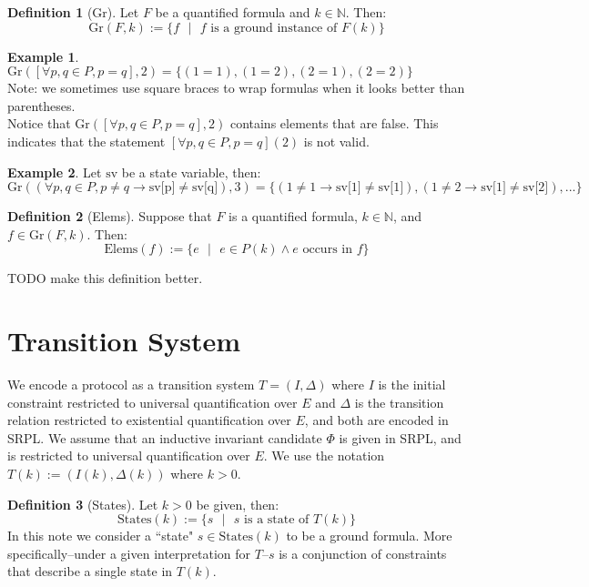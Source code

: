 \documentclass[12pt]{article}
\theoremstyle{definition}
\newtheorem{definition}{Definition}
\newtheorem{example}{Example}
\theoremstyle{remark}
\newcommand{\st}{\text{ }|\text{ }}
\newcommand{\states}{\text{States}}
\newcommand{\gr}{\text{Gr}}
\newcommand{\elems}{\text{Elems}}
\begin{document}
\begin{definition}[Gr]
  Let $F$ be a quantified formula and $k \in \mathbb{N}$.  Then:
  $$\gr(F,k) := \{f \st f \text{ is a ground instance of } F(k)\}$$
\end{definition}

\begin{example}
  $\gr([\forall p,q \in P, p=q],2) = \{(1=1),(1=2),(2=1),(2=2)\}$\\
  Note: we sometimes use square braces to wrap formulas when it looks better than parentheses.\\
  Notice that $\gr([\forall p,q \in P, p=q],2)$ contains elements that are false.  This indicates that the statement $[\forall p,q \in P, p=q](2)$ is not valid.
\end{example}
\begin{example}
  Let $\text{sv}$ be a state variable, then:
  $$\gr((\forall p,q \in P, p \neq q \rightarrow \text{sv[p]} \neq \text{sv[q]}),3) = \{(1 \neq 1 \rightarrow \text{sv[1]} \neq \text{sv[1]}),(1 \neq 2 \rightarrow \text{sv[1]} \neq \text{sv[2]}),...\}$$
\end{example}

\begin{definition}[Elems]
  Suppose that $F$ is a quantified formula, $k \in \mathbb{N}$, and $f \in \gr(F,k)$.  Then:
  $$\elems(f) := \{e \st e \in P(k) \land e \text{ occurs in } f\}$$

  TODO make this definition better.
\end{definition}



\section{Transition System}

We encode a protocol as a transition system $T=(I,\Delta)$ where $I$ is the initial constraint restricted to universal quantification over $E$ and $\Delta$ is the transition relation restricted to existential quantification over $E$, and both are encoded in SRPL.  We assume that an inductive invariant candidate $\Phi$ is given in SRPL, and is restricted to universal quantification over $E$.  We use the notation $T(k):=(I(k),\Delta(k))$ where $k>0$.

\begin{definition}[States]
  Let $k>0$ be given, then:
  $$\states(k) := \{s \st s \text{ is a state of } T(k)\}$$
  In this note we consider a ``state" $s \in \states(k)$ to be a ground formula.  More specifically--under a given interpretation for $T$--$s$ is a conjunction of constraints that describe a single state in $T(k)$.
\end{definition}
\end{document}
